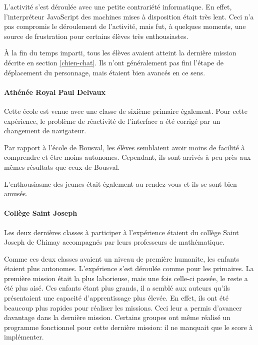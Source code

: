 L'activité s'est déroulée avec une petite contrariété informatique. En effet, l'interpréteur JavaScript des machines mises à disposition était très lent. Ceci n'a pas compromis le déroulement de l'activité, mais fut, à quelques moments, une source de frustration pour certains élèves très enthousiastes.

À la fin du temps imparti, tous les élèves avaient atteint la dernière \gls{mission} décrite en section \ref{chien-chat}. Ils n'ont généralement pas fini l'étape de déplacement du personnage, mais étaient bien avancés en ce sens.

\paragraph{Athénée Royal Paul Delvaux}
Cette école est venue avec une classe de sixième \gls{primaire} également. Pour cette expérience, le problème de réactivité de l'interface a été corrigé par un changement de navigateur.

Par rapport à l'école de Bousval, les élèves semblaient avoir moins de facilité à comprendre et être moins autonomes.
Cependant, ils sont arrivés à peu près aux mêmes résultats que ceux de Bousval.

L'enthousiasme des jeunes était également au rendez-vous et ils se sont bien amusés.

\paragraph{Collège Saint Joseph}
Les deux dernières classes à participer à l'expérience étaient du collège Saint Joseph de Chimay accompagnés par leurs professeurs de mathématique.%

Comme ces deux classes avaient un niveau de première \gls{humanite}, les enfants étaient plus autonomes. L'expérience s'est déroulée comme pour les \glspl{primaire}. La première \gls{mission} était la plus laborieuse, mais une fois celle-ci passée, le reste a été plus aisé. Ces enfants étant plus grands, il a semblé aux auteurs qu'ils présentaient une capacité d'apprentissage plus élevée. En effet, ils ont été beaucoup plus rapides pour réaliser les \glspl{mission}. Ceci leur a permis d'avancer davantage dans la dernière \gls{mission}. Certains groupes ont même réalisé un programme fonctionnel pour cette dernière \gls{mission}: il ne manquait que le score à implémenter.\\

